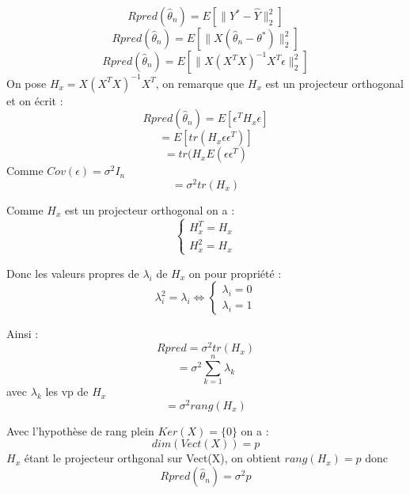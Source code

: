 $$ Rpred(\hat{\theta}_n) = E\left[\| Y^* - \hat{Y} \|^2_2\right] $$
$$ Rpred(\hat{\theta}_n)  = E\left[\| X(\hat{\theta}_n - \theta^*) \|^2_2\right] $$
$$ Rpred(\hat{\theta}_n) = E \left[ \| X(X^TX)^{-1}X^T \epsilon \|^2_2 \right] $$
On pose $H_x = X(X^TX)^{-1}X^T$, on remarque que $H_x$ est un projecteur orthogonal et on écrit :
$$ Rpred(\hat{\theta}_n) = E\left[ \epsilon^TH_x\epsilon \right]$$
$$ = E\left[ tr(H_x \epsilon \epsilon^T)\right]$$
$$ = tr(H_x E(\epsilon\epsilon^T) $$ Comme $Cov(\epsilon) = \sigma^2 I_n$
$$ = \sigma^2 tr(H_x)$$

Comme $H_x$ est un projecteur orthogonal on a :
\smallbreak
$$
\begin{cases}
    H_x^T = H_x  \\
    H_x^2 = H_x
\end{cases} $$

Donc les valeurs propres de $\lambda_i$ de $H_x$ on pour propriété : 
$$\lambda_i^2 = \lambda_i \Longleftrightarrow 
\begin{cases}
    \lambda_i = 0  \\
    \lambda_i = 1
\end{cases} $$

Ainsi : 
$$ Rpred = \sigma^2 tr(H_x)$$
$$ = \sigma^2 \sum^n_{k=1} \lambda_k$$ avec $\lambda_k$ les vp de $H_x$
$$ = \sigma^2 rang(H_x)$$

Avec l'hypothèse de rang plein $Ker(X) = \{0\}$ on a :
$$dim(Vect(X)) = p$$
$H_x$ étant le projecteur orthgonal sur Vect(X), on obtient $rang(H_x) = p$
donc 
$$Rpred(\hat{\theta}_n) = \sigma^2 p$$




